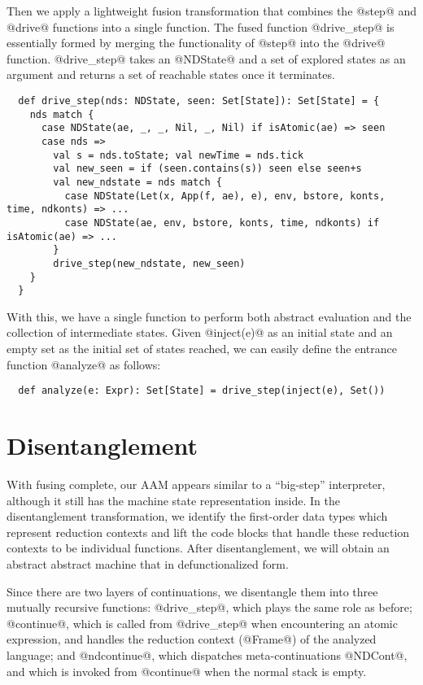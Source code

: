 \documentclass[acmsmall, review]{acmart}\settopmatter{}
\begin{document}
Then we apply a lightweight fusion transformation that combines the @step@ and @drive@
functions into a single function.
The fused function @drive_step@ is essentially formed by merging the functionality of
@step@ into the @drive@ function.
@drive_step@ takes an @NDState@ and a set of explored states as an argument
and returns a set of reachable states once it terminates.

\begin{lstlisting}
  def drive_step(nds: NDState, seen: Set[State]): Set[State] = {
    nds match {
      case NDState(ae, _, _, Nil, _, Nil) if isAtomic(ae) => seen
      case nds =>
        val s = nds.toState; val newTime = nds.tick
        val new_seen = if (seen.contains(s)) seen else seen+s
        val new_ndstate = nds match {
          case NDState(Let(x, App(f, ae), e), env, bstore, konts, time, ndkonts) => ...
          case NDState(ae, env, bstore, konts, time, ndkonts) if isAtomic(ae) => ...
        }
        drive_step(new_ndstate, new_seen)
    }
  }
\end{lstlisting}

With this, we have a single function to perform both abstract evaluation and the collection of
intermediate states. Given @inject(e)@ as an initial state and an empty set as the
initial set of states reached, we can easily define the entrance function @analyze@ as
follows:

\begin{lstlisting}
  def analyze(e: Expr): Set[State] = drive_step(inject(e), Set())
\end{lstlisting}

\section{Disentanglement} \label{disen}

With fusing complete, our AAM appears similar to a ``big-step'' interpreter, although it
still has the machine state representation inside. In the disentanglement transformation,
we identify the first-order data types which represent reduction contexts
and lift the code blocks that handle these reduction contexts to be individual functions.
After disentanglement, we will obtain an abstract abstract machine that in defunctionalized form.

Since there are two layers of continuations, we disentangle them into three mutually recursive 
functions:
@drive_step@, which plays the same role as before; @continue@, which is called from
@drive_step@ when encountering an atomic expression, and handles the reduction context
(@Frame@) of the analyzed language; and @ndcontinue@, which dispatches meta-continuations
@NDCont@, and which is invoked from @continue@ when the normal stack is empty.
\end{document}
